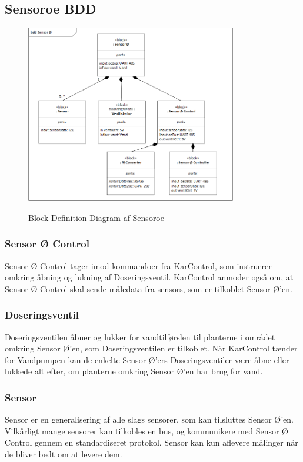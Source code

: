 
\subsection{Sensoroe BDD}

\begin{figure}[H]
	\centering
	\includegraphics[width=0.82\textwidth]{Systemarkitektur/Sensoroe/Sensoroe_BDD.png}
	\label{fig:Sensoroe BDD}
	\caption{Block Definition Diagram af Sensoroe}
\end{figure}

\subsubsection*{Sensor Ø Control}
Sensor Ø Control tager imod kommandoer fra KarControl, som instruerer omkring åbning og lukning af Doseringsventil. KarControl anmoder også om, at Sensor Ø Control skal sende måledata fra sensors, som er tilkoblet Sensor Ø’en.

\subsubsection{Doseringsventil}
Doseringsventilen åbner og lukker for vandtilførslen til planterne i området omkring Sensor Ø’en, som Doseringsventilen er tilkoblet. Når KarControl tænder for Vandpumpen kan de enkelte Sensor Ø’ers Doseringsventiler være åbne eller lukkede alt efter, om planterne omkring Sensor Ø’en har brug for vand.

\subsubsection{Sensor}
Sensor er en generalisering af alle slags sensorer, som kan tilsluttes Sensor Ø’en. Vilkårligt mange sensorer kan tilkobles en bus, og kommunikere med Sensor Ø Control gennem en standardiseret protokol. Sensor kan kun aflevere målinger når de bliver bedt om at levere dem.

